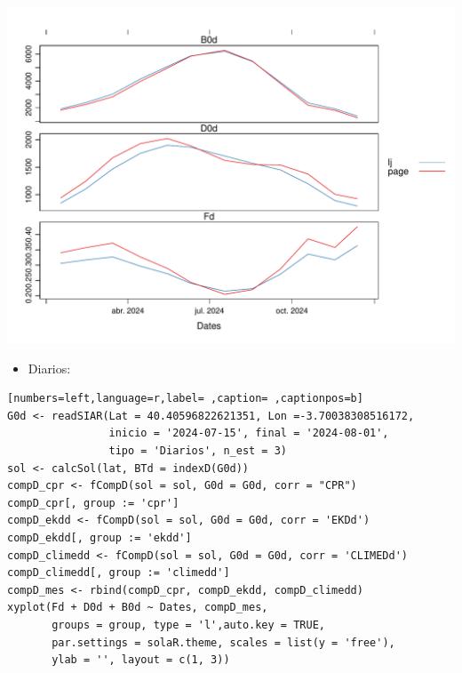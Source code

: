 \begin{itemize}
\begin{itemize}
\begin{center}
\includegraphics[width=\textwidth]{figuras/codigo-fcompdmes.pdf}
\end{center}
\begin{itemize}
\item Diarios:
\end{itemize}
\begin{lstlisting}[numbers=left,language=r,label= ,caption= ,captionpos=b]
G0d <- readSIAR(Lat = 40.40596822621351, Lon =-3.70038308516172,
                inicio = '2024-07-15', final = '2024-08-01',
                tipo = 'Diarios', n_est = 3)
sol <- calcSol(lat, BTd = indexD(G0d))
compD_cpr <- fCompD(sol = sol, G0d = G0d, corr = "CPR")
compD_cpr[, group := 'cpr']
compD_ekdd <- fCompD(sol = sol, G0d = G0d, corr = 'EKDd')
compD_ekdd[, group := 'ekdd']
compD_climedd <- fCompD(sol = sol, G0d = G0d, corr = 'CLIMEDd')
compD_climedd[, group := 'climedd']
compD_mes <- rbind(compD_cpr, compD_ekdd, compD_climedd)
xyplot(Fd + D0d + B0d ~ Dates, compD_mes,
       groups = group, type = 'l',auto.key = TRUE,
       par.settings = solaR.theme, scales = list(y = 'free'),
       ylab = '', layout = c(1, 3))
\end{lstlisting}


\end{itemize}
\end{itemize}
